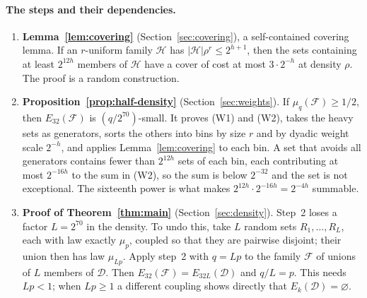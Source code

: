 \documentclass[11pt,letterpaper]{article}
\theoremstyle{definition}
\theoremstyle{remark}
\numberwithin{equation}{section}
\begin{document}
\paragraph{The steps and their dependencies.}
\begin{enumerate}
\item \textbf{Lemma~\ref{lem:covering}} (Section~\ref{sec:covering}),
a self-contained covering lemma. If an $r$-uniform family $\mathcal H$ has
$|\mathcal H|\rho^r\le2^{h+1}$, then the sets containing at least $2^{12h}$
members of $\mathcal H$ have a cover of cost at most $3\cdot2^{-h}$ at
density $\rho$. The proof is a random construction.
\item \textbf{Proposition~\ref{prop:half-density}}
(Section~\ref{sec:weights}). If $\mu_q(\mathcal F)\ge1/2$, then
$E_{32}(\mathcal F)$ is $(q/2^{70})$-small. It proves (W1) and (W2), takes
the heavy sets as generators, sorts the others into bins by size $r$ and by
dyadic weight scale $2^{-h}$, and applies Lemma~\ref{lem:covering} to each
bin. A set that avoids all generators contains fewer than $2^{12h}$ sets of
each bin, each contributing at most $2^{-16h}$ to the sum in (W2), so the
sum is below $2^{-32}$ and the set is not exceptional. The sixteenth power
is what makes $2^{12h}\cdot2^{-16h}=2^{-4h}$ summable.
\item \textbf{Proof of Theorem~\ref{thm:main}} (Section~\ref{sec:density}).
Step~2 loses a factor $L=2^{70}$ in the density. To undo this, take
$L$ random sets $R_1,\ldots,R_L$, each with law exactly $\mu_p$, coupled so
that they are pairwise disjoint; their union then has law $\mu_{Lp}$.
Apply step~2 with $q=Lp$ to the family $\mathcal F$ of unions of $L$
members of $\mathcal D$. Then $E_{32}(\mathcal F)=E_{32L}(\mathcal D)$ and
$q/L=p$. This needs $Lp<1$; when $Lp\ge1$ a different coupling shows
directly that $E_k(\mathcal D)=\varnothing$.
\end{enumerate}

\begin{center}
\end{center}
\end{document}
